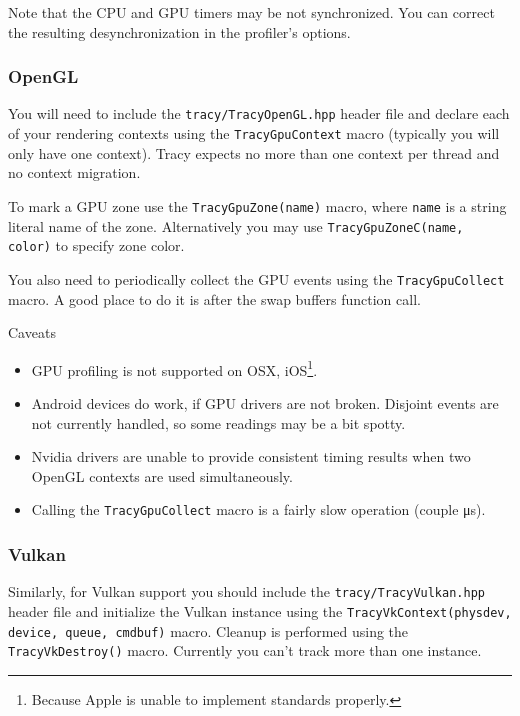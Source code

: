 \documentclass[hidelinks,titlepage,a4paper]{article}
\begin{document}
Note that the CPU and GPU timers may be not synchronized. You can correct the resulting desynchronization in the profiler's options.

\subsubsection{OpenGL}

You will need to include the \texttt{tracy/TracyOpenGL.hpp} header file and declare each of your rendering contexts using the \texttt{TracyGpuContext} macro (typically you will only have one context). Tracy expects no more than one context per thread and no context migration.

To mark a GPU zone use the \texttt{TracyGpuZone(name)} macro, where \texttt{name} is a string literal name of the zone. Alternatively you may use \texttt{TracyGpuZoneC(name, color)} to specify zone color.

You also need to periodically collect the GPU events using the \texttt{TracyGpuCollect} macro. A good place to do it is after the swap buffers function call.

\begin{bclogo}[
noborder=true,
couleur=black!5,
logo=\bcattention
]{Caveats}
\begin{itemize}
\item GPU profiling is not supported on OSX, iOS\footnote{Because Apple is unable to implement standards properly.}.
\item Android devices do work, if GPU drivers are not broken. Disjoint events are not currently handled, so some readings may be a bit spotty.
\item Nvidia drivers are unable to provide consistent timing results when two OpenGL contexts are used simultaneously.
\item Calling the \texttt{TracyGpuCollect} macro is a fairly slow operation (couple \si{\micro\second}).
\end{itemize}
\end{bclogo}

\subsubsection{Vulkan}

Similarly, for Vulkan support you should include the \texttt{tracy/TracyVulkan.hpp} header file and initialize the Vulkan instance using the \texttt{TracyVkContext(physdev, device, queue, cmdbuf)} macro. Cleanup is performed using the \texttt{TracyVkDestroy()} macro. Currently you can't track more than one instance.
\end{document}
